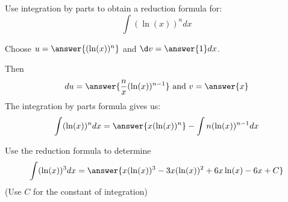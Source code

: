 \documentclass{ximera}
\author{Jason Miller}
\begin{document}
\begin{exercise}

Use integration by parts to obtain a reduction formula for:
\[
\int (\ln(x))^{n} dx
\]


Choose $u=\answer{( \ln(x) )^{n} }$ and $\d v=\answer{1} dx$.

Then
\[ du=\answer{\frac{n}{x}( \ln(x) )^{n-1}} \textrm{  and  } v=\answer{x}
\]
The integration by parts formula gives us:
\[
\int ( \ln(x) )^{n} dx=\answer{x (\ln(x))^{n}} -  \int n (\ln(x))^{n-1} dx
\]

Use the reduction formula to determine 
\[
\int ( \ln(x))^{3} dx=\answer{x(\ln(x))^{3} -3x (\ln(x))^{2} + 6x \ln(x) -6x +C }
\]
(Use $C$ for the constant of integration)

\end{exercise}
\end{document}
